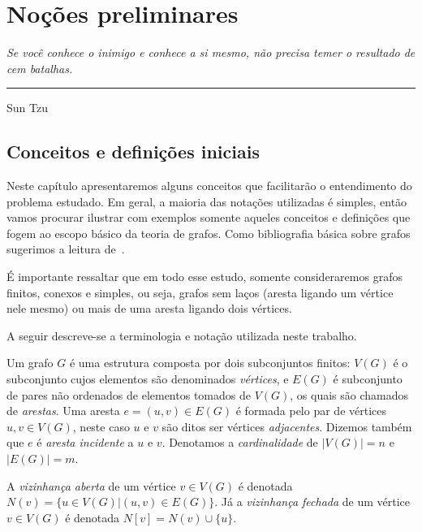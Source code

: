 \chapter{Noções preliminares}\label{Notions}


\begin{flushright}
\begin{minipage}[t][0cm][b]{0.47\textwidth}
\emph{Se você conhece o inimigo e conhece a si mesmo, não precisa temer o resultado de cem batalhas. }
\end{minipage}

\rule[0cm]{7cm}{0.03cm}%

Sun Tzu
\end{flushright}

\section{Conceitos e definições iniciais}

Neste capítulo apresentaremos alguns conceitos que facilitarão o entendimento do problema estudado. Em geral, a maioria das notações utilizadas é simples, então vamos procurar ilustrar com exemplos somente aqueles conceitos e definições que fogem ao escopo básico da teoria de grafos. Como bibliografia básica sobre grafos sugerimos a leitura de~\cite{jayme2018}.

É importante ressaltar que em todo esse estudo, somente consideraremos grafos finitos, conexos e simples, ou seja, grafos sem
laços (aresta ligando um vértice nele mesmo) ou mais de uma aresta ligando dois
vértices.

A seguir descreve-se a terminologia e notação utilizada neste trabalho.

Um grafo $G$ é uma estrutura composta por dois subconjuntos finitos: $V(G)$ é o subconjunto cujos elementos são denominados \emph{vértices}, e $E(G)$ é subconjunto de pares não ordenados de elementos tomados de $V(G)$, os quais são chamados de \emph{arestas}. Uma aresta $e = (u,v)\in E(G)$ é formada pelo par de vértices $u,v \in V(G)$, neste caso $u$ e $v$ são ditos ser vértices \emph{adjacentes}. Dizemos também que  $e$ é \emph{aresta incidente} a $u$ e $v$. Denotamos a \emph{cardinalidade} de $|V(G)| = n$ e $|E(G)| = m$.

A \emph{vizinhança aberta} de um vértice $v\in V(G)$ é denotada $N(v) = \{u\in V(G) | (u,v) \in E(G)\}$. Já a \emph{vizinhança fechada} de um vértice $v\in V(G)$ é denotada $N[v] = N(v) \cup \{u\}$. 

